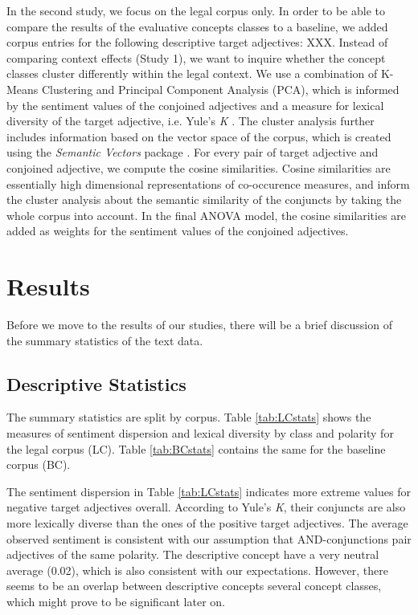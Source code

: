 \documentclass{article}
\begin{document}
In the second study, we focus on the legal corpus only. In order to be able to compare the results of the evaluative concepts classes to a baseline, we added corpus entries for the following descriptive target adjectives: XXX. Instead of comparing context effects (Study 1), we want to inquire whether the concept classes cluster differently within the legal context. We use a combination of K-Means Clustering and Principal Component Analysis (PCA), which is informed by the sentiment values of the conjoined adjectives and a measure for lexical diversity of the target adjective, i.e. Yule's \textit{K} \citep{Yule1944, Tweedie1998}. The cluster analysis further includes information based on the vector space of the corpus, which is created using the \textit{Semantic Vectors} package \citep{Widdows2008, Widdows2010, Widdows2016}. For every pair of target adjective and conjoined adjective, we compute the cosine similarities. Cosine similarities are essentially high dimensional representations of co-occurence measures, and inform the cluster analysis about the semantic similarity of the conjuncts by taking the whole corpus into account. In the final ANOVA model, the cosine similarities are added as weights for the sentiment values of the conjoined adjectives.

\section{Results}

Before we move to the results of our studies, there will be a brief discussion of the summary statistics of the text data.

\subsection{Descriptive Statistics}

The summary statistics are split by corpus. Table \ref{tab:LCstats} shows the measures of sentiment dispersion and lexical diversity by class and polarity for the legal corpus (LC). Table \ref{tab:BCstats} contains the same for the baseline corpus (BC). 

The sentiment dispersion in Table \ref{tab:LCstats} indicates more extreme values for negative target adjectives overall. According to Yule's \textit{K}, their conjuncts are also more lexically diverse than the ones of the positive target adjectives. The average observed sentiment is consistent with our assumption that AND-conjunctions pair adjectives of the same polarity. The descriptive concept have a very neutral average (0.02), which is also consistent with our expectations. However, there seems to be an overlap between descriptive concepts several concept classes, which might prove to be significant later on.
\end{document}
